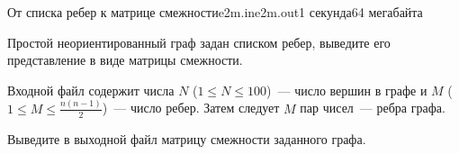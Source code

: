 \begin{problem}{От списка ребер к матрице смежности}{e2m.in}{e2m.out}{1 секунда}{64 мегабайта}

Простой неориентированный граф задан списком ребер, выведите его представление в виде матрицы смежности.

\InputFile

Входной файл содержит числа $N$ ($1 \leqslant N \leqslant 100$)~---
число вершин в графе и $M$ ($1 \leqslant M \leqslant \frac{n(n-1)}{2}$)~--- число ребер. Затем следует $M$ пар чисел~--- ребра графа.

\OutputFile

Выведите в выходной файл матрицу смежности заданного графа.

\Example

\begin{example}
%
\end{example}

\end{problem}

